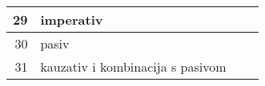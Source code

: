 	\noindent
	
	\begin{tabular}{|r|p{150pt}|p{150pt}|p{120pt}|}
		\hline
		29&imperativ&&\\
		\hline
		30&pasiv&&\\
		\hline
		31&kauzativ i kombinacija s pasivom&&\\
		\hline
	\end{tabular}

